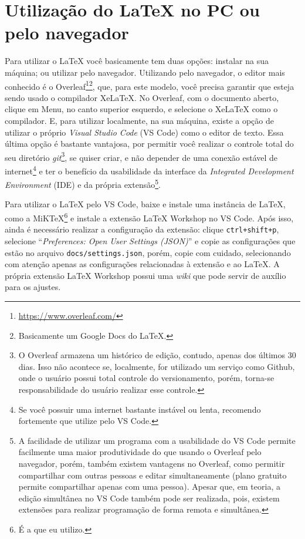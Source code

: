 \section{Utilização do \LaTeX{} no PC ou pelo navegador}
Para utilizar o \LaTeX{} você basicamente tem duas opções: instalar na sua máquina; ou utilizar pelo navegador. Utilizando pelo navegador, o editor mais conhecido é o Overleaf\footnote{\url{https://www.overleaf.com/}}\footnote{Basicamente um Google Docs do \LaTeX{}.}, que, para este modelo, você precisa garantir que esteja sendo usado o compilador XeLaTeX. No Overleaf, com o documento aberto, clique em Menu, no canto superior esquerdo, e selecione o XeLaTeX como o compilador. E, para utilizar localmente, na sua máquina, existe a opção de utilizar o próprio \textit{Visual Studio Code} (VS Code) como o editor de texto. Essa última opção é bastante vantajosa, por permitir você realizar o controle total do seu diretório \textit{git}\footnote{O Overleaf armazena um histórico de edição, contudo, apenas dos últimos 30 dias. Isso não acontece se, localmente, for utilizado um serviço como Github, onde o usuário possui total controle do versionamento, porém, torna-se responsabilidade do usuário realizar esse controle.}, se quiser criar, e não depender de uma conexão estável de internet\footnote{Se você possuir uma internet bastante instável ou lenta, recomendo fortemente que utilize pelo VS Code.} e ter o benefício da usabilidade da interface da \textit{Integrated Development Environment} (IDE) e da própria extensão\footnote{A facilidade de utilizar um programa com a usabilidade do VS Code permite facilmente uma maior produtividade do que usando o Overleaf pelo navegador, porém, também existem vantagens no Overleaf, como permitir compartilhar com outras pessoas e editar simultaneamente (plano gratuito permite compartilhar apenas com uma pessoa). Apesar que, em teoria, a edição simultânea no VS Code também pode ser realizada, pois, existem extensões para realizar programação de forma remota e simultânea.}.

Para utilizar o \LaTeX{} pelo VS Code, baixe e instale uma instância de \LaTeX{}, como a MiKTeX\footnote{É a que eu utilizo.} e instale a extensão LaTeX Workshop no VS Code. Após isso, ainda é necessário realizar a configuração da extensão: clique \texttt{ctrl+shift+p}, selecione ``\textit{Preferences: Open User Settings (JSON)}'' e copie as configurações que estão no arquivo \texttt{docs/settings.json}, porém, copie com cuidado, selecionando com atenção apenas as configurações relacionadas à extensão e ao \LaTeX{}. A própria extensão LaTeX Workshop possui uma \textit{wiki} que pode servir de auxílio para os ajustes.

